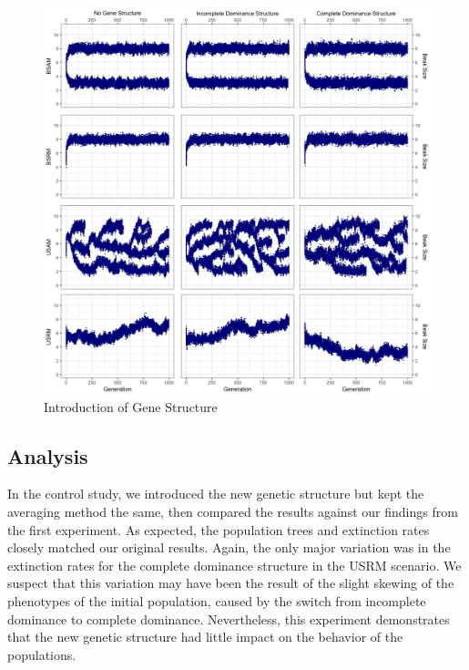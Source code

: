 \documentclass[conference]{IEEEtran}
\begin{document}
\begin{figure}
    \centering
    \includegraphics[width=\linewidth]{Data/EXP2}
    \caption{Introduction of Gene Structure}
    \label{fig:EXP2}
\end{figure}

\subsection{Analysis}

In the control study, we introduced the new genetic structure but kept the averaging method the same, then compared the results against our findings from the first experiment. As expected, the population trees and extinction rates closely matched our original results. Again, the only major variation was in the extinction rates for the complete dominance structure in the USRM scenario. We suspect that this variation may have been the result of the slight skewing of the phenotypes of the initial population, caused by the switch from incomplete dominance to complete dominance. Nevertheless, this experiment demonstrates that the new genetic structure had little impact on the behavior of the populations.
\end{document}
